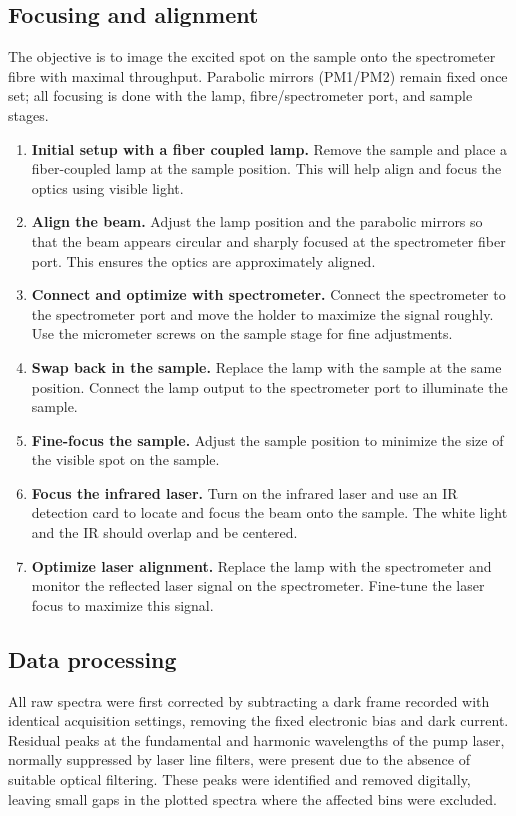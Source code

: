 \documentclass[
	parskip=half,
	a4paper,
]{scrarticle}
\begin{document}
\subsection{Focusing and alignment}
The objective is to image the excited spot on the sample onto the spectrometer fibre with maximal throughput. Parabolic mirrors (PM1/PM2) remain fixed once set; all focusing is done with the lamp, fibre/spectrometer port, and sample stages.

\begin{enumerate}
  \item \textbf{Initial setup with a fiber coupled lamp.}  
  Remove the sample and place a fiber-coupled lamp at the sample position. This will help align and focus the optics using visible light.

  \item \textbf{Align the beam.}  
  Adjust the lamp position and the parabolic mirrors so that the beam appears circular and sharply focused at the spectrometer fiber port. This ensures the optics are approximately aligned.

  \item \textbf{Connect and optimize with spectrometer.}  
  Connect the spectrometer to the spectrometer port and move the holder to maximize the signal roughly. Use the micrometer screws on the sample stage for fine adjustments.

  \item \textbf{Swap back in the sample.}  
  Replace the lamp with the sample at the same position. Connect the lamp output to the spectrometer port to illuminate the sample.

  \item \textbf{Fine-focus the sample.}  
  Adjust the sample position to minimize the size of the visible spot on the sample.

  \item \textbf{Focus the infrared laser.}  
  Turn on the infrared laser and use an IR detection card to locate and focus the beam onto the sample. The white light and the IR should overlap and be centered.

  \item \textbf{Optimize laser alignment.}  
  Replace the lamp with the spectrometer and monitor the reflected laser signal on the spectrometer. Fine-tune the laser focus to maximize this signal.
\end{enumerate}

\subsection{Data processing}
All raw spectra were first corrected by subtracting a dark frame recorded with identical acquisition settings, removing the fixed electronic bias and dark current.  
Residual peaks at the fundamental and harmonic wavelengths of the pump laser, normally suppressed by laser line filters, were present due to the absence of suitable optical filtering.  
These peaks were identified and removed digitally, leaving small gaps in the plotted spectra where the affected bins were excluded.  
\end{document}
